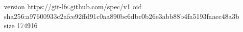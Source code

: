 version https://git-lfs.github.com/spec/v1
oid sha256:a97600933c2afce92ffd91c0aa890bc6dbc0b26e3abb88b4fa5193faaec48a3b
size 174916
